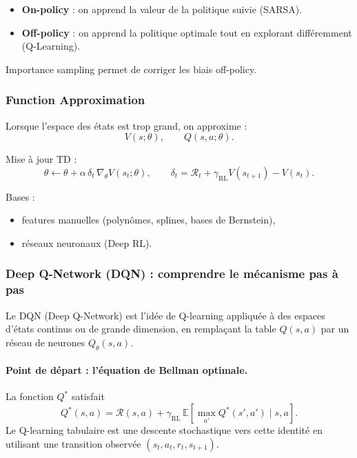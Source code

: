 \documentclass[11pt,a4paper]{article}
\newcommand{\1}{\mathbf{1}}
\begin{document}
\begin{itemize}
  \item \textbf{On-policy} : on apprend la valeur de la politique suivie (SARSA).
  \item \textbf{Off-policy} : on apprend la politique optimale tout en explorant
        différemment (Q-Learning).
\end{itemize}

Importance sampling permet de corriger les biais off-policy.

\subsubsection{Function Approximation}

Lorsque l'espace des états est trop grand, on approxime :
\[
V(s;\theta),\qquad Q(s,a;\theta).
\]

Mise à jour TD :
\[
\theta \leftarrow \theta
+ \alpha\, \delta_t \, \nabla_\theta V(s_t;\theta),
\qquad
\delta_t = \mathcal{R}_t + \gamma_{\mathrm{RL}} V(s_{t+1}) - V(s_t).
\]

Bases :
\begin{itemize}
  \item features manuelles (polynômes, splines, bases de Bernstein),
  \item réseaux neuronaux (Deep RL).
\end{itemize}

\subsubsection{Deep Q-Network (DQN) : comprendre le m\'ecanisme pas \`a pas}

Le DQN (Deep Q-Network) est l'id\'ee de Q-learning appliqu\'ee \`a des espaces d'\'etats continus
ou de grande dimension, en rempla\c{c}ant la table $Q(s,a)$ par un r\'eseau de neurones
$Q_\theta(s,a)$.

\paragraph{Point de d\'epart : l'\'equation de Bellman optimale.}
La fonction $Q^*$ satisfait
\[
Q^*(s,a)=\mathcal{R}(s,a)+\gamma_{\mathrm{RL}}\,\mathbb{E}\!\left[\max_{a'}Q^*(s',a')\mid s,a\right].
\]
Le Q-learning tabulaire est une descente stochastique vers cette identit\'e en utilisant une transition observ\'ee
$(s_t,a_t,r_t,s_{t+1})$.
\end{document}

